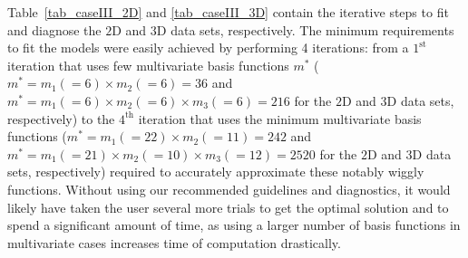 Table~\ref{tab_caseIII_2D} and \ref{tab_caseIII_3D} contain the iterative steps to fit and diagnose the $2$D and $3$D data sets, respectively. 
The minimum requirements to fit the models were easily achieved by performing 4 iterations: from a $1^{\text{st}}$ iteration that uses few multivariate basis functions $m^*$ ($m^*=m_1(=6) \times m_2(=6)=36$ and $m^*=m_1(=6) \times m_2(=6) \times m_3(=6)=216$ for the $2$D and $3$D data sets, respectively) to the $4^{\text{th}}$ iteration that uses the minimum multivariate basis functions ($m^*=m_1(=22) \times m_2(=11)=242$ and $m^*=m_1(=21) \times m_2(=10) \times m_3(=12)=2520$ for the $2$D and $3$D data sets, respectively) required to accurately approximate these notably wiggly functions. Without using our recommended guidelines and diagnostics, it would likely have taken the user several more trials to get the optimal solution and to spend a significant amount of time, as using a larger number of basis functions in multivariate cases increases time of computation drastically.

